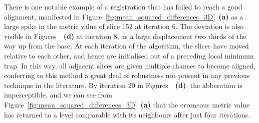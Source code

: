   There is one notable example of a registration that has failed to reach a good alignment, manifested in Figure~\ref{fig:mean_squared_differences_3D}~\textbf{(a)} as a large spike in the metric value of slice 152 at iteration 6. The deviation is also visible in Figures~~\textbf{(d)} at iteration 8, as a large displacement two thirds of the way up from the base. At each iteration of the algorithm, the slices have moved relative to each other, and hence are initialised out of a preceding local minimum trap. In this way, all adjacent slices are given multiple chances to become aligned, conferring to this method a great deal of robustness not present in any previous technique in the literature. By iteration 20 in Figures~~\textbf{(d)}, the abberation is imperceptible, and we can see from Figure~\ref{fig:mean_squared_differences_3D}~\textbf{(a)} that the erroneous metric value has returned to a level comparable with its neighbours after just four iterations.
  
